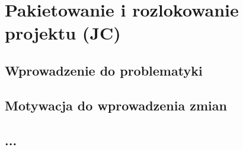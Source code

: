 \clearpage
\section{Pakietowanie i rozlokowanie projektu (JC)}
\label{ch:packages}

\subsection{Wprowadzenie do problematyki}

\subsection{Motywacja do wprowadzenia zmian}

\subsection{...}